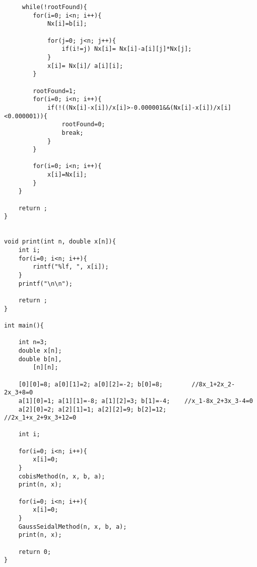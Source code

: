 \vspace{\baselineskip}
\begin{tcolorbox}
\begin{verbatim}
	 while(!rootFound){
		for(i=0; i<n; i++){		
			Nx[i]=b[i];
			
			for(j=0; j<n; j++){
				if(i!=j) Nx[i]= Nx[i]-a[i][j]*Nx[j];
			}
			x[i]= Nx[i]/ a[i][i];
		}
		
		rootFound=1;				
		for(i=0; i<n; i++){
			if(!((Nx[i]-x[i])/x[i]>-0.000001&&(Nx[i]-x[i])/x[i]<0.000001)){
				rootFound=0;
				break;
			}
		}
		
		for(i=0; i<n; i++){		
			x[i]=Nx[i];
		}
	}
	
	return ;
}


void print(int n, double x[n]){
	int i;
	for(i=0; i<n; i++){
		rintf("%lf, ", x[i]);
	}
	printf("\n\n");
	
	return ;
}

int main(){
	
	int n=3;			
	double x[n];		
	double b[n],		
		[n][n];		 
		
	[0][0]=8; a[0][1]=2; a[0][2]=-2; b[0]=8;		//8x_1+2x_2-2x_3+8=0
	a[1][0]=1; a[1][1]=-8; a[1][2]=3; b[1]=-4;	  //x_1-8x_2+3x_3-4=0
	a[2][0]=2; a[2][1]=1; a[2][2]=9; b[2]=12;	   //2x_1+x_2+9x_3+12=0
	
	int i;
	
	for(i=0; i<n; i++){	 
		x[i]=0;
	}
	cobisMethod(n, x, b, a);
	print(n, x);

	for(i=0; i<n; i++){	
		x[i]=0;
	}
	GaussSeidalMethod(n, x, b, a);
	print(n, x);
	
	return 0;
}

\end{verbatim}
\end{tcolorbox}
\vspace{\baselineskip}
